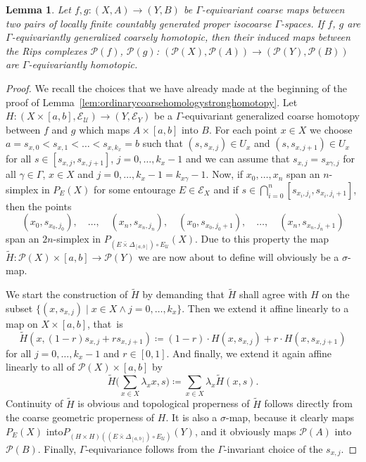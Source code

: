 \documentclass[pdftex]{sigma}
\numberwithin{equation}{section}
\newtheorem{lem}[thm]{Lemma}
\theoremstyle{definition}
\newcommand{\cP}{\mathcal{P}}
\newcommand{\cU}{\mathcal{U}}
\newcommand{\coarseStr}{\mathcal{E}}
\newcommand{\Diag}[1][]{{\Delta_{#1}}}
\newcommand{\swapcross}{\mathbin{\bar\times}}
\begin{document}
\begin{lem}\label{lem:Ripshomotopy}
Let $f,g\colon (X,A)\to (Y,B)$ be $\Gamma$-equivariant coarse maps between two pairs of locally finite countably generated proper isocoarse $\Gamma$-spaces. If $f$, $g$ are $\Gamma$-equi\-variantly gene\-ralized coarsely homotopic, then their induced maps between the Rips complexes $\cP(f)$, $\cP(g)$: $(\cP(X),\cP(A))\to(\cP(Y),\cP(B))$ are $\Gamma$-equivariantly homotopic.
\end{lem}

\begin{proof}
We recall the choices that we have already made at the beginning of the proof of Lemma~\ref{lem:ordinarycoarsehomologystronghomotopy}.
Let $H\colon (X\times [a,b],\coarseStr_\cU)\to (Y,\coarseStr_Y)$ be a $\Gamma$-equivariant generalized coarse homotopy between $f$ and $g$ which maps $A\times[a,b]$ into $B$.
For each point $x\in X$ we choose $a=s_{x,0}<s_{x,1}<\dots<s_{x,k_x}=b$ such that $(s,s_{x,j})\in U_x$ and $(s,s_{x,j+1})\in U_x$ for all $s\in[s_{x,j},s_{x,j+1}]$, $j=0,\dots,k_x-1$ and we can assume that $s_{x,j}=s_{x\gamma,j}$ for all $\gamma\in \Gamma$, $x\in X$ and $j=0,\dots,k_x-1=k_{x\gamma}-1$.
Now, if $x_0,\dots,x_n$ span an $n$-simplex in $P_E(X)$ for some entourage $E\in\coarseStr_X$ and if $s\in\bigcap_{i=0}^n[s_{x_i,j_i},s_{x_i,j_i+1}]$, then the points
\[
(x_0,s_{x_0,j_0}),\quad\dots,\quad(x_n,s_{x_n,j_n}),\quad(x_0,s_{x_0,j_0+1}),\quad\dots,\quad(x_n,s_{x_n,j_n+1})
\]
span an $2n$-simplex in $P_{(E\swapcross\Diag[{[a,b]}])\circ E_\cU}(X)$.
Due to this property the map $\tilde H\colon\cP(X)\times[a,b]\to\cP(Y)$ we are now about to define will obviously be a $\sigma$-map.

We start the construction of $\tilde H$ by demanding that $\tilde H$ shall agree with $H$ on the subset $\{(x,s_{x,j})\mid x\in X\wedge j=0,\dots,k_x\}$. Then we extend it affine linearly to a map on $X\times[a,b]$, that~is
\[
\tilde H(x,(1-r)s_{x,j}+rs_{x,j+1})\coloneqq (1-r)\cdot H(x,s_{x,j})+r\cdot H(x,s_{x,j+1})
\]
for all $j=0,\dots,k_x-1$ and $r\in[0,1]$.
And finally, we extend it again affine linearly to all of $\cP(X)\times[a,b]$ by
\[
\tilde H\bigg(\sum_{x\in X} \lambda_xx,s\biggr)\coloneqq \sum_{x\in X} \lambda_x\tilde H(x,s).
\]
Continuity of $\tilde H$ is obvious and topological properness of $\tilde H$ follows directly from the coarse \mbox{geometric} properness of $H$.
It is also a $\sigma$-map, because it clearly maps $P_E(X)$ into\linebreak $P_{(H\times H)((E\swapcross\Diag[{[a,b]}])\circ E_\cU)}(Y)$, and it obviously maps $\cP(A)$ into $\cP(B)$.
Finally, $\Gamma$-equivariance follows from the $\Gamma$-invariant choice of the $s_{x,j}$.
\end{proof}
\end{document}
